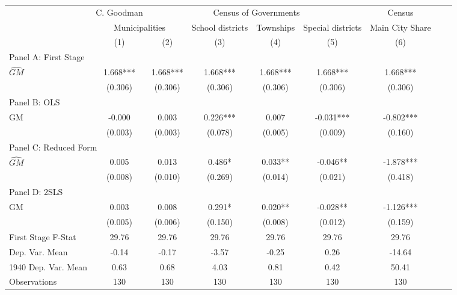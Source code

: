  \begin{tabular}{l*{8}{c}} \toprule
&\multicolumn{1}{c}{C. Goodman}&\multicolumn{4}{c}{Census of Governments}&\multicolumn{1}{c}{Census}\\\cmidrule(lr){2-2}\cmidrule(lr){3-6}\cmidrule(lr){7-7}
&\multicolumn{2}{c}{Municipalities}&\multicolumn{1}{c}{School districts}&\multicolumn{1}{c}{Townships}&\multicolumn{1}{c}{Special districts}&\multicolumn{1}{c}{Main City Share}\\\cmidrule(lr){2-3}\cmidrule(lr){4-6}\cmidrule(lr){7-7}
&\multicolumn{1}{c}{(1)}&\multicolumn{1}{c}{(2)}&\multicolumn{1}{c}{(3)}&\multicolumn{1}{c}{(4)}&\multicolumn{1}{c}{(5)}&\multicolumn{1}{c}{(6)}\\
\cmidrule(lr){1-7}
\multicolumn{6}{l}{Panel A: First Stage}\\
\cmidrule(lr){1-7}
$\widehat{GM}$  &    1.668***&    1.668***&    1.668***&    1.668***&    1.668***&    1.668***\\
                &  (0.306)   &  (0.306)   &  (0.306)   &  (0.306)   &  (0.306)   &  (0.306)   \\
\cmidrule(lr){1-7}
\multicolumn{6}{l}{Panel B: OLS}\\
\cmidrule(lr){1-7}
GM              &   -0.000   &    0.003   &    0.226***&    0.007   &   -0.031***&   -0.802***\\
                &  (0.003)   &  (0.003)   &  (0.078)   &  (0.005)   &  (0.009)   &  (0.160)   \\
\cmidrule(lr){1-7}
\multicolumn{6}{l}{Panel C: Reduced Form}\\
\cmidrule(lr){1-7}
$\widehat{GM}$  &    0.005   &    0.013   &    0.486*  &    0.033** &   -0.046** &   -1.878***\\
                &  (0.008)   &  (0.010)   &  (0.269)   &  (0.014)   &  (0.021)   &  (0.418)   \\
\cmidrule(lr){1-7}
\multicolumn{6}{l}{Panel D: 2SLS}\\
\cmidrule(lr){1-7}
GM              &    0.003   &    0.008   &    0.291*  &    0.020** &   -0.028** &   -1.126***\\
                &  (0.005)   &  (0.006)   &  (0.150)   &  (0.008)   &  (0.012)   &  (0.159)   \\
\midrule
First Stage F-Stat&    29.76   &    29.76   &    29.76   &    29.76   &    29.76   &    29.76   \\
Dep. Var. Mean  &    -0.14   &    -0.17   &    -3.57   &    -0.25   &     0.26   &   -14.64   \\
1940 Dep. Var. Mean&     0.63   &     0.68   &     4.03   &     0.81   &     0.42   &    50.41   \\
Observations    &      130   &      130   &      130   &      130   &      130   &      130   \\
       \bottomrule \end{tabular}
